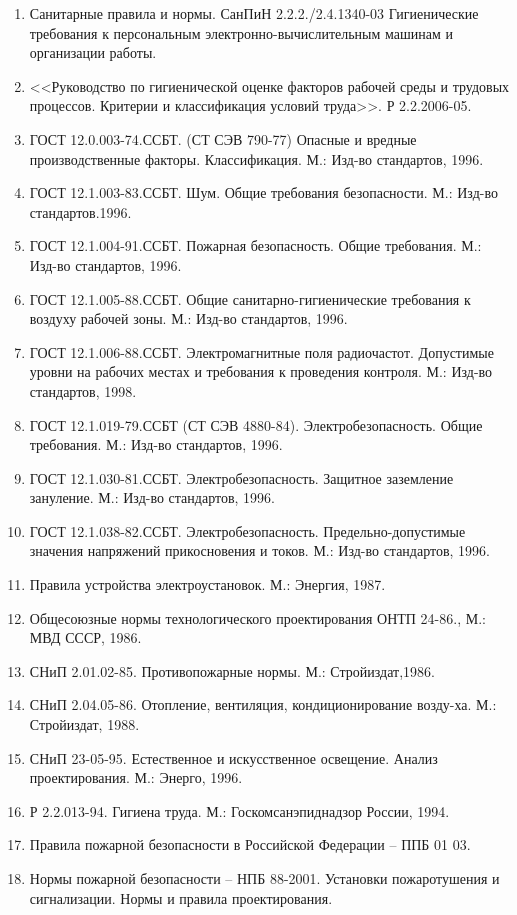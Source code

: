 \begin{enumerate}[1.]
	\item Санитарные правила и нормы. СанПиН 2.2.2./2.4.1340-03 Гигиенические требования к персональным электронно-вычислительным машинам и организации работы. 
	\item <<Руководство по гигиенической оценке факторов рабочей среды  и трудовых процессов. Критерии и классификация условий труда>>. Р 2.2.2006-05.
	\item ГОСТ 12.0.003-74.ССБТ. (СТ СЭВ 790-77) Опасные и вредные производственные факторы. Классификация. М.: Изд-во стандартов, 1996.
	\item ГОСТ 12.1.003-83.ССБТ. Шум. Общие требования безопасности. М.: Изд-во стандартов.1996.
	\item ГОСТ 12.1.004-91.ССБТ. Пожарная безопасность. Общие требования. М.: Изд-во стандартов, 1996.
	\item ГОСТ 12.1.005-88.ССБТ. Общие санитарно-гигиенические требования к воздуху рабочей зоны. М.: Изд-во стандартов, 1996.
	\item ГОСТ 12.1.006-88.ССБТ. Электромагнитные поля  радиочастот. Допустимые уровни на рабочих местах и требования к проведения контроля. М.: Изд-во стандартов, 1998.
	\item ГОСТ 12.1.019-79.ССБТ (СТ СЭВ 4880-84). Электробезопасность. Общие требования. М.: Изд-во стандартов, 1996.
	\item ГОСТ 12.1.030-81.ССБТ. Электробезопасность. Защитное заземление зануление. М.: Изд-во стандартов, 1996.
	\item ГОСТ 12.1.038-82.ССБТ. Электробезопасность. Предельно-допустимые \\ значения напряжений прикосновения и токов. М.: Изд-во стандартов, 1996.
	\item Правила устройства электроустановок. М.: Энергия, 1987.
	\item Общесоюзные нормы технологического проектирования ОНТП 24-86., М.: МВД СССР, 1986.
	\item СНиП 2.01.02-85. Противопожарные нормы. М.: Стройиздат,1986.
	\item СНиП 2.04.05-86. Отопление, вентиляция, кондиционирование возду-ха. М.: Стройиздат, 1988.
	\item СНиП 23-05-95. Естественное и искусственное освещение. Анализ проектирования. М.: Энерго, 1996.
	\item Р 2.2.013-94. Гигиена труда. М.: Госкомсанэпиднадзор России, 1994.
	\item Правила пожарной безопасности в Российской Федерации – ППБ 01 03. 
	\item Нормы пожарной безопасности – НПБ 88-2001. Установки пожаротушения и сигнализации. Нормы и правила проектирования.
\end{enumerate}

